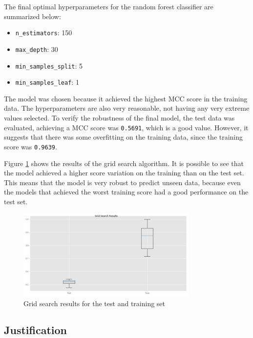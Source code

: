 \documentclass[11pt]{article}
\providecommand{\tightlist}{%
      \setlength{\itemsep}{0pt}\setlength{\parskip}{0pt}}
\begin{document}
The final optimal hyperparameters for the random forest classifier are
summarized below:

\begin{itemize}
\tightlist
\item
  \texttt{n\_estimators}: 150
\item
  \texttt{max\_depth}: 30
\item
  \texttt{min\_samples\_split}: 5
\item
  \texttt{min\_samples\_leaf}: 1
\end{itemize}

The model was chosen because it achieved the highest MCC score in the
training data. The hyperparameters are also very reasonable, not having
any very extreme values selected. To verify the robustness of the final
model, the test data was evaluated, achieving a MCC score was
\texttt{0.5691}, which is a good value. However, it suggests that there
was some overfitting on the training data, since the training score was
\texttt{0.9639}.

Figure \ref{fig:grid_serch} shows the results of the grid search algorithm. It is possible to see that the model achieved a higher score variation on the training than on the test set. This means that the model is very robust to predict unseen data, because even the models that achieved the worst training score had a good performance on the test set. 

\begin{figure}[h]
	\centering
	\includegraphics[width=0.8\textwidth]{model_grid_search_statistics.png}
	\caption{Grid search results for the test and training set}
	\label{fig:grid_serch}
\end{figure}


\hypertarget{justification}{%
\subsection{Justification}\label{justification}}
\end{document}
